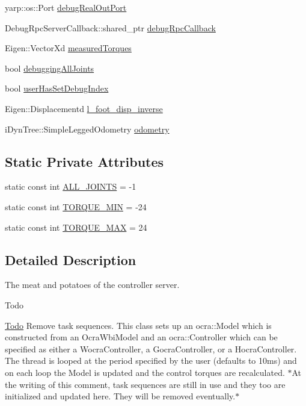 \begin{DoxyCompactItemize}
yarp\-::os\-::\-Port \hyperlink{classThread_a9bd7f6aebc0be4709f32f95aa32f1add}{debug\-Real\-Out\-Port}
\item 
\-Debug\-Rpc\-Server\-Callback\-::shared\-\_\-ptr \hyperlink{classThread_a42833af67d5280e6946a31a03737e017}{debug\-Rpc\-Callback}
\item 
\-Eigen\-::\-Vector\-Xd \hyperlink{classThread_aa9cbe8744e51571a17fa726d8d16a0c6}{measured\-Torques}
\item 
bool \hyperlink{classThread_aba345996b91a57d9e1f2dd15c7c75e08}{debugging\-All\-Joints}
\item 
bool \hyperlink{classThread_a20581ff7f2cfb2efe1fbc2aa703438a4}{user\-Has\-Set\-Debug\-Index}
\item 
\-Eigen\-::\-Displacementd \hyperlink{classThread_a304e7ee40ec0ceec2fc7ca80353ab478}{l\-\_\-foot\-\_\-disp\-\_\-inverse}
\item 
i\-Dyn\-Tree\-::\-Simple\-Legged\-Odometry \hyperlink{classThread_a23a41c6ccd1df898084112cfd46120f3}{odometry}
\end{DoxyCompactItemize}
\subsection*{\-Static \-Private \-Attributes}
\begin{DoxyCompactItemize}
\item 
static const int \hyperlink{classThread_a875b3311a39e3b87dbc981f2db7b1b9d}{\-A\-L\-L\-\_\-\-J\-O\-I\-N\-T\-S} = -\/1
\item 
static const int \hyperlink{classThread_ad44e5fbda8070c252ea71823a4b9a6db}{\-T\-O\-R\-Q\-U\-E\-\_\-\-M\-I\-N} = -\/24
\item 
static const int \hyperlink{classThread_a5e864394c4bd0fbdf3cba7f6f825e17d}{\-T\-O\-R\-Q\-U\-E\-\_\-\-M\-A\-X} = 24
\end{DoxyCompactItemize}


\subsection{\-Detailed \-Description}
\-The meat and potatoes of the controller server. 

\begin{DoxyRefDesc}{\-Todo}
\item[\hyperlink{todo__todo000001}{\-Todo}]\-Remove task sequences. \-This class sets up an ocra\-::\-Model which is constructed from an \-Ocra\-Wbi\-Model and an ocra\-::\-Controller which can be specified as either a \-Wocra\-Controller, a \-Gocra\-Controller, or a \-Hocra\-Controller. \-The thread is looped at the period specified by the user (defaults to 10ms) and on each loop the \-Model is updated and the control torques are recalculated. $\ast$\-At the writing of this comment, task sequences are still in use and they too are initialized and updated here. \-They will be removed eventually.$\ast$ \end{DoxyRefDesc}


